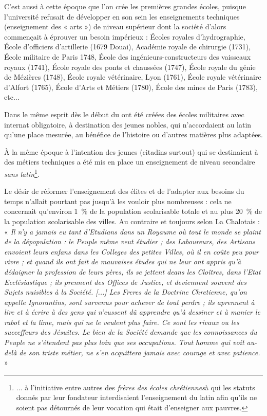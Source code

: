  C'est aussi à cette époque que l'on crée les premières grandes écoles, puisque l'université refusait de développer en son sein les enseignements techniques (enseignement des « arts ») de niveau supérieur dont la société d'alors commençait à éprouver un besoin impérieux : Écoles royales d'hydrographie, École d'officiers d'artillerie (1679 Douai), Académie royale de chirurgie (1731), École militaire de Paris 1748, École des ingénieurs-constructeurs des vaisseaux royaux (1741), École royale des ponts et chaussées (1747), École royale du génie de Mézières (1748), École royale vétérinaire, Lyon (1761), École royale vétérinaire d'Alfort (1765), École d'Arts et Métiers (1780), École des mines de Paris (1783), etc...
 
 Dans le même esprit dès le début du  ont été créées des écoles militaires avec internat obligatoire, à destination des jeunes nobles, qui n'accordaient au latin qu'une place mesurée, au bénéfice de l'histoire ou d'autres matières plus adaptées. 
 
 À la même époque à l'intention des jeunes (citadins surtout) qui se destinaient à des métiers techniques a été mis en place un enseignement de niveau secondaire \emph{sans latin}\footnote{... à l'initiative entre autres des \emph{frères des écoles chrétiennes}à qui les statuts donnés par leur fondateur interdisaient l'enseignement du latin afin qu'ils ne soient pas détournés de leur vocation qui était d'enseigner aux pauvres.}. 



Le désir de réformer l'enseignement des élites  et de l'adapter aux besoins du temps n'allait pourtant pas jusqu'à les vouloir plus nombreuses : cela ne concernait qu'environ 1~\% de la population scolarisable totale et au plus 20~\% de la population scolarisable des villes. Au contraire et toujours selon La Chalotais : « \emph{Il n'y a jamais eu tant d'Etudians dans un Royaume où tout le monde se plaint de la dépopulation : le Peuple même veut étudier ; des Laboureurs, des Artisans envoient leurs enfans dans les Colleges des petites Villes, où il en coûte peu pour vivre ; et quand ils ont fait de mauvaises études qui ne leur ont appris qu'à dédaigner la profession de leurs pères, ils se jettent deans les Cloîtres, dans l'Etat Ecclésiastique ; ils prennent des Offices de Justice, et deviennent souvent des Sujets nuisibles à la Société. [...] Les Freres de la Doctrine Chretienne, qu'on appelle Ignorantins, sont survenus pour achever de tout perdre ; ils aprennent à lire et à écrire à des gens qui n'eussent dû apprendre qu'à dessiner et à manier le rabot et la lime, mais qui ne le veulent plus faire. Ce sont les rivaux ou les succeffeurs des Jésuites. Le bien de la Société demande que les connoissances du Peuple ne s'étendent pas plus loin que ses occupations. Tout homme qui voit au-delà de son triste métier, ne s'en acquittera jamais avec courage et avec patience.} »


